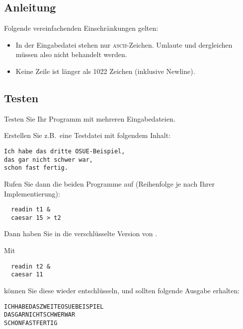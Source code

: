 \subsection*{Anleitung}

Folgende vereinfachenden Einschränkungen gelten:

\begin{itemize}
\item In der Eingabedatei stehen nur \textsc{ascii}-Zeichen. Umlaute und
dergleichen müssen also nicht behandelt werden.
\item Keine Zeile ist länger als 1022 Zeichen (inklusive Newline).
\end{itemize}

\subsection*{Testen}

Testen Sie Ihr Programm mit mehreren Eingabedateien.

Erstellen Sie z.B.\ eine Testdatei  mit folgendem Inhalt:
\begin{verbatim}
Ich habe das dritte OSUE-Beispiel,
das gar nicht schwer war,
schon fast fertig.
\end{verbatim}
Rufen Sie dann die beiden Programme auf (Reihenfolge je nach Ihrer
Implementierung):
\begin{verbatim}
  readin t1 &
  caesar 15 > t2
\end{verbatim}
Dann haben Sie in  die verschlüsselte Version von
.

Mit
\begin{verbatim}
  readin t2 &
  caesar 11
\end{verbatim}
können Sie diese wieder entschlüsseln, und sollten folgende Ausgabe
erhalten:
\begin{verbatim}
ICHHABEDASZWEITEOSUEBEISPIEL
DASGARNICHTSCHWERWAR
SCHONFASTFERTIG
\end{verbatim}

\osueguidelinesthree



